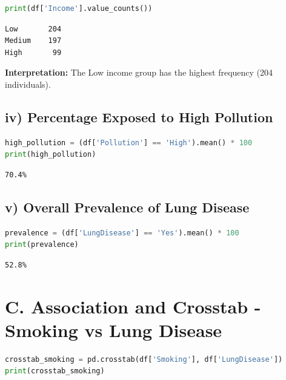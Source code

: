 \documentclass[12pt, a4paper]{article}
\begin{document}
\begin{lstlisting}[language=Python]
print(df['Income'].value_counts())
\end{lstlisting}

\begin{outputbox}
\begin{verbatim}
Low       204
Medium    197
High       99
\end{verbatim}
\end{outputbox}

\textbf{\textcolor{RoyalNavy}{Interpretation:}} The Low income group has the highest frequency (204 individuals).

\subsection*{iv) Percentage Exposed to High Pollution}

\begin{lstlisting}[language=Python]
high_pollution = (df['Pollution'] == 'High').mean() * 100
print(high_pollution)
\end{lstlisting}

\begin{outputbox}
\begin{verbatim}
70.4%
\end{verbatim}
\end{outputbox}

\subsection*{v) Overall Prevalence of Lung Disease}

\begin{lstlisting}[language=Python]
prevalence = (df['LungDisease'] == 'Yes').mean() * 100
print(prevalence)
\end{lstlisting}

\begin{outputbox}
\begin{verbatim}
52.8%
\end{verbatim}
\end{outputbox}

\section*{C. Association and Crosstab - Smoking vs Lung Disease}

\begin{lstlisting}[language=Python]
crosstab_smoking = pd.crosstab(df['Smoking'], df['LungDisease'])
print(crosstab_smoking)
\end{lstlisting}
\end{document}
